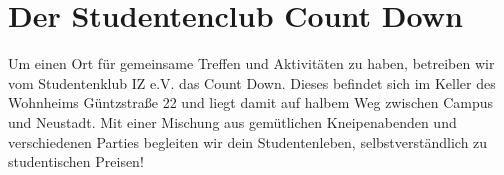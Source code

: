 \section{Der Studentenclub Count Down}

Um einen Ort für gemeinsame Treffen und Aktivitäten zu haben, betreiben wir vom Studentenklub IZ e.V. das Count Down. Dieses befindet sich im Keller des Wohnheims Güntzstraße 22 und liegt damit auf halbem Weg zwischen Campus und Neustadt. Mit einer Mischung aus gemütlichen Kneipenabenden und verschiedenen Parties begleiten wir dein Studentenleben, selbstverständlich zu studentischen Preisen!
